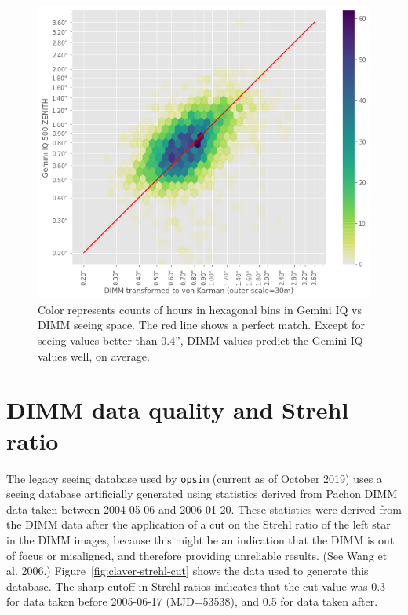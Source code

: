 \documentclass[DM,authoryear,toc]{lsstdoc}
\begin{document}
\begin{figure}
  \includegraphics[width=\columnwidth]{./figures/geminiIQ_vs_dimm_hexbin.png}
  \caption{ Color represents counts of hours in hexagonal bins in
    Gemini IQ vs DIMM seeing space. The red line shows a perfect
    match. Except for seeing values better than 0.4'', DIMM values
    predict the Gemini IQ values well, on average.}
  \label{fig:gemini-vs-dimm-hexbin}
\end{figure}


\section{DIMM data quality and Strehl ratio}

The legacy seeing database used by \texttt{opsim} (current as of
October 2019) uses a seeing database artificially generated using
statistics derived from Pachon DIMM data taken between 2004-05-06 and
2006-01-20. These statistics were derived from the DIMM data after the
application of a cut on the Strehl ratio of the left star in the DIMM
images, because this might be an indication that the DIMM is out of
focus or misaligned, and therefore providing unreliable results. (See
Wang et al. 2006.) Figure~\ref{fig:claver-strehl-cut} shows the data used to
generate this database. The sharp cutoff in Strehl ratios indicates
that the cut value was 0.3 for data taken before 2005-06-17
(MJD=53538), and 0.5 for data taken after.
\end{document}
